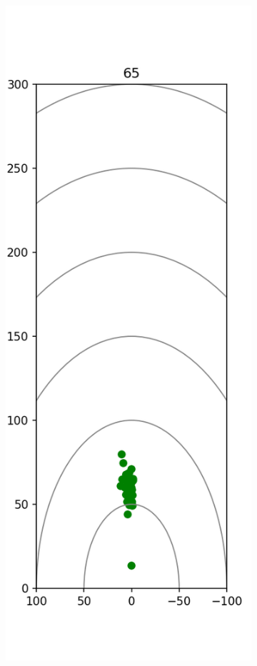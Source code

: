 \documentclass{kththesis}
\begin{document}
\begin{figure}
    \centering
    \begin{subfigure}{0.4\textwidth}
    \centering
    \includegraphics[height=0.4\textheight]{Shots/65_shots.png} 

\end{subfigure}
\end{figure}
\end{document}
